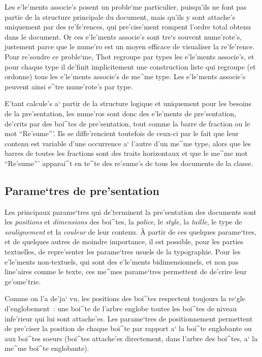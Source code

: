 {Les e'le'ments associe's posent un proble`me particulier, puisqu'ils ne font
pas partie de la structure principale du document, mais qu'ils y sont
attache's uniquement par des re'fe'rences, qui pre'cise'ment rompent l'ordre
total obtenu dans le document. Or ces e'le'ments associe's sont tre`s souvent
nume'rote's, justement parce que le nume'ro est un moyen efficace de visualiser
la re'fe'rence. Pour re'soudre ce proble`me, Thot regroupe  par types les
e'le'ments associe's, et pour chaque type il de'finit implicitement une
construction liste qui regroupe (et ordonne) tous les e'le'ments associe's
de me^me type. Les e'le'ments associe's peuvent ainsi e^tre nume'rote's par
type.

E'tant calcule's a` partir de la structure logique et uniquement pour les besoins
de la pre'sentation, les nume'ros sont donc des e'le'ments de pre'sentation,
de'crits par des boi^tes de pre'sentation, tout comme la barre de fraction
ou le mot ``Re'sume'''. Ils se diffe'rencient toutefois de ceux-ci par le fait
que leur contenu est variable d'une occurrence a` l'autre d'un me^me type,
alors que les barres de toutes les fractions sont des traits horizontaux
et que le me^me mot ``Re'sume''' apparai^t en te^te des re'sume's de tous les
documents de la classe.

\subsection{Parame`tres de pre'sentation}

Les principaux parame`tres qui de'terminent la pre'sentation des documents sont
les {\em positions} et {\em dimensions} des boi^tes, la {\em police}, le
{\em style}, la {\em taille}, le type de {\em soulignement} et la
{\em couleur} de leur contenu.
\`{A} partir de ces quelques parame`tres, et de quelques
autres de moindre importance, il est possible, pour les parties textuelles,
de repre'senter les parame`tres usuels de la typographie. Pour les e'le'ments
non-textuels, qui sont des e'le'ments bidimensionnels, et non pas line'aires
comme le texte, ces me^mes parame`tres permettent de de'crire leur ge'ome'trie.

Comme on l'a de'ja` vu, les positions des boi^tes respectent
toujours la re`gle d'englobement~: une boi^te de l'arbre englobe
toutes les boi^tes de niveau infe'rieur qui lui sont attache'es.
Les parame`tres de positionnement permettent de pre'ciser la position
de chaque boi^te par rapport a` la boi^te englobante ou aux boi^tes
soeurs (boi^tes attache'es directement, dans l'arbre des boi^tes, a` la
me^me boi^te englobante).

}
